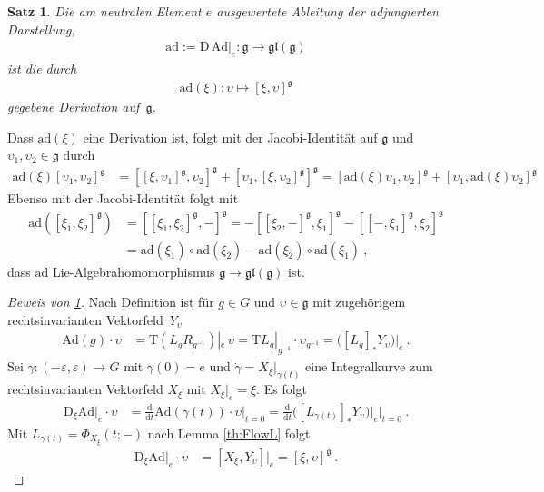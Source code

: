 \documentclass[10pt,a4paper]{article}
\theoremstyle{mytheorem}
\newtheorem{theorem}{Satz}[section]
\theoremstyle{mydefinition}
\newcommand{\dt}{\mathrm{d}}
\newcommand{\Dt}{\mathrm{D}}
\newcommand{\Tt}{\mathrm{T}}
\newcommand{\ad}{\mathrm{ad}}
\newcommand{\Ad}{\mathrm{Ad}}
\newcommand{\fg}{\mathfrak{g}}
\begin{document}
\begin{theorem}
\label{th:ad}
Die am neutralen Element $e$ ausgewertete Ableitung der adjungierten Darstellung,
\begin{align*}
	\ad:=\Dt\,\Ad|_e: \mathfrak{g}\rightarrow\mathfrak{gl}(\mathfrak{g})
\end{align*}
ist die durch
\begin{align*}
	\ad(\xi): \upsilon\mapsto[\xi,\upsilon]^\fg
\end{align*}
gegebene Derivation auf~$\mathfrak{g}$.
\end{theorem}
Dass $\ad(\xi)$ eine Derivation ist, folgt mit der Jacobi-Identität auf $\mathfrak{g}$ und $\upsilon_1,\upsilon_2\in\fg$ durch
\begin{align*}
\ad(\xi) [\upsilon_1,\upsilon_2]^\fg
&= 
[[\xi, \upsilon_1]^\fg,\upsilon_2]^\fg + [\upsilon_1, [\xi, \upsilon_2]^\fg]^\fg
=[\ad(\xi) \upsilon_1,\upsilon_2]^\fg + [\upsilon_1,\ad(\xi)\upsilon_2]^\fg
\end{align*}
Ebenso mit der Jacobi-Identität folgt mit
\begin{align*}
	\ad([\xi_1,\xi_2]^\fg)
	&= [[\xi_1,\xi_2]^\fg, -]^\fg
	= -[[\xi_2,-]^\fg, \xi_1]^\fg-[[-,\xi_1]^\fg, \xi_2]^\fg
	\nonumber\\
	&= \ad(\xi_1)\circ \ad(\xi_2) - \ad(\xi_2)\circ \ad(\xi_1)
	\ ,
\end{align*}
dass $\ad$ Lie-Algebrahomomorphismus $\mathfrak{g}\rightarrow\mathfrak{gl}(\mathfrak{g})$ ist.

\begin{proof}[Beweis von \ref{th:ad}]
Nach Definition ist für $g\in G$ und $\upsilon\in\mathfrak{g}$ mit zugehörigem rechtsinvarianten Vektorfeld~$Y_\upsilon$
\begin{align*}
	\Ad(g)\cdot\upsilon
	&= 
	\Tt(L_{g}R_{g^{-1}})|_e\,\upsilon
	=
	\Tt L_{g}|_{g^{-1}}
	\cdot
	\upsilon_{g^{-1}}
	=  
	\big(
		[L_{g}]_* Y_\upsilon
	\big)
	\big|_e
	\ .	
\end{align*}
Sei  $\gamma:(-\varepsilon,\varepsilon)\rightarrow G$ mit $\gamma(0)=e$ und $\dot{\gamma}=X_\xi|_{\gamma(t)}$ eine Integralkurve zum rechtsinvarianten Vektorfeld $X_\xi$ mit $X_\xi|_e=\xi$.
Es folgt
\begin{align*}
	\Dt_{\xi}\Ad|_e\cdot\upsilon
	&=
	\frac{\dt}{\dt t}
	\Ad(\gamma(t))\cdot\upsilon
	\Big|_{t=0}
	=
	\frac{\dt}{\dt t}
	\big(
		[L_{\gamma(t)}]_* Y_\upsilon
	\big)
	\big|_e
	\Big|_{t=0}
	\ .
\end{align*}
Mit $L_{\gamma(t)}=\Phi_{X_\xi}(t;-)$ nach Lemma \ref{th:FlowL} folgt
\begin{align*}
	\Dt_{\xi}\Ad|_e\cdot\upsilon
	&=
	[X_\xi,Y_\upsilon]|_e = [\xi, \upsilon]^\mathfrak{g}
	\ .
\end{align*}
\end{proof}
	
\end{document}

